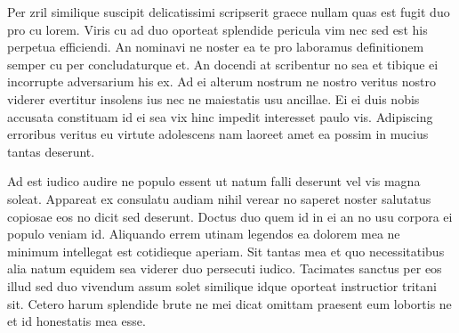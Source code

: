 Per zril similique suscipit delicatissimi scripserit graece nullam quas est fugit duo pro cu lorem. Viris cu ad duo oporteat splendide pericula vim nec sed est his perpetua efficiendi. An nominavi ne noster ea te pro laboramus definitionem semper cu per concludaturque et. An docendi at scribentur no sea et tibique ei incorrupte adversarium his ex. Ad ei alterum nostrum ne nostro veritus nostro viderer evertitur insolens ius nec ne maiestatis usu ancillae. Ei ei duis nobis accusata constituam id ei sea vix hinc impedit interesset paulo vis. Adipiscing erroribus veritus eu virtute adolescens nam laoreet amet ea possim in mucius tantas deserunt.

Ad est iudico audire ne populo essent ut natum falli deserunt vel vis magna soleat. Appareat ex consulatu audiam nihil verear no saperet noster salutatus copiosae eos no dicit sed deserunt. Doctus duo quem id in ei an no usu corpora ei populo veniam id. Aliquando errem utinam legendos ea dolorem mea ne minimum intellegat est cotidieque aperiam. Sit tantas mea et quo necessitatibus alia natum equidem sea viderer duo persecuti iudico. Tacimates sanctus per eos illud sed duo vivendum assum solet similique idque oporteat instructior tritani sit. Cetero harum splendide brute ne mei dicat omittam praesent eum lobortis ne et id honestatis mea esse.